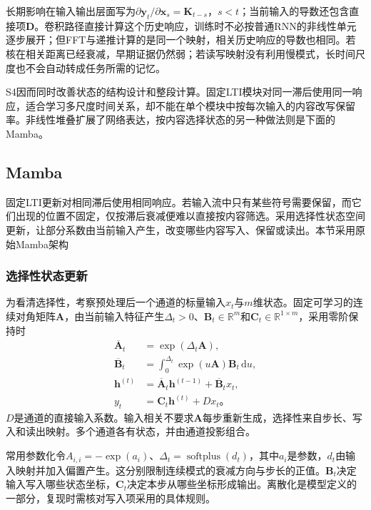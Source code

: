 长期影响在输入输出层面写为$\partial\bm y_t/\partial\bm x_s=\bm K_{t-s}$，$s<t$；当前输入的导数还包含直接项$\bm D$。卷积路径直接计算这个历史响应，训练时不必按普通RNN的非线性单元逐步展开；但FFT与递推计算的是同一个映射，相关历史响应的导数也相同。若核在相关距离已经衰减，早期证据仍然弱；若读写映射没有利用慢模式，长时间尺度也不会自动转成任务所需的记忆。

S4因而同时改善状态的结构设计和整段计算。固定LTI模块对同一滞后使用同一响应，适合学习多尺度时间关系，却不能在单个模块中按每次输入的内容改写保留率。非线性堆叠扩展了网络表达，按内容选择状态的另一种做法则是下面的Mamba。

\subsection{Mamba}
\label{sec:rnn-mamba}

固定LTI更新对相同滞后使用相同响应。若输入流中只有某些符号需要保留，而它们出现的位置不固定，仅按滞后衰减便难以直接按内容筛选。采用选择性状态空间更新，让部分系数由当前输入产生，改变哪些内容写入、保留或读出。本节采用原始Mamba架构

\subsubsection{选择性状态更新}
\label{sec:rnn-mamba-selection}

为看清选择性，考察预处理后一个通道的标量输入$x_t$与$m$维状态。固定可学习的连续对角矩阵$\bm A$，由当前输入特征产生$\Delta_t>0$、$\bm B_t\in\mathbb R^m$和$\bm C_t\in\mathbb R^{1\times m}$，采用零阶保持时
\begin{equation}
  \begin{aligned}
    \overline{\bm A}_t&=\exp(\Delta_t\bm A),\\
    \overline{\bm B}_t&=\int_0^{\Delta_t}\exp(u\bm A)\bm B_t\,\mathrm du,\\
    \bm h^{(t)}&=\overline{\bm A}_t\bm h^{(t-1)}+\overline{\bm B}_t x_t,\\
    y_t&=\bm C_t\bm h^{(t)}+D x_t\text{。}
  \end{aligned}
  \label{eq:rnn-mamba-selection}
\end{equation}
$D$是通道的直接输入系数。输入相关不要求$\bm A$每步重新生成，选择性来自步长、写入和读出映射。多个通道各有状态，并由通道投影组合。

常用参数化令$A_{i,i}=-\exp(a_i)$、$\Delta_t=\operatorname{softplus}(d_t)$，其中$a_i$是参数，$d_t$由输入映射并加入偏置产生。这分别限制连续模式的衰减方向与步长的正值。$\bm B_t$决定输入写入哪些状态坐标，$\bm C_t$决定本步从哪些坐标形成输出。离散化是模型定义的一部分，复现时需核对写入项采用的具体规则。

